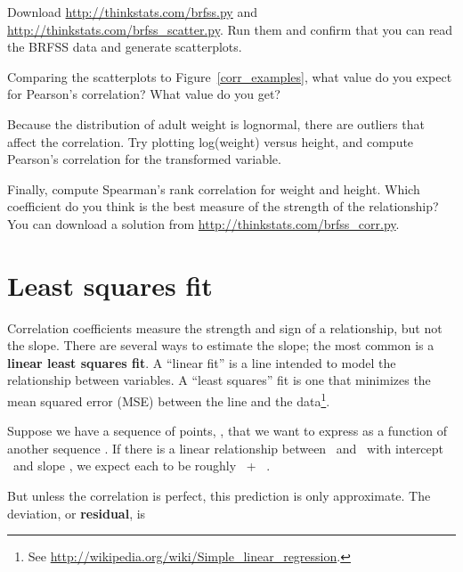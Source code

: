 \documentclass[12pt]{book}
\begin{document}
\begin{exercise}
Download \url{http://thinkstats.com/brfss.py} and
\url{http://thinkstats.com/brfss_scatter.py}.  Run them and confirm that you
can read the BRFSS data and generate scatterplots.

Comparing the scatterplots to Figure~\ref{corr_examples}, what value
do you expect for Pearson's correlation?  What value do you get?

Because the distribution of adult weight is lognormal, there are
outliers that affect the correlation.  Try plotting
log(weight) versus height, and compute Pearson's
correlation for the transformed variable.

Finally, compute Spearman's rank correlation for weight and height.
Which coefficient do you think is the best measure of the strength of
the relationship?  You can download a solution from
\url{http://thinkstats.com/brfss_corr.py}.

\end{exercise}


\section{Least squares fit}

Correlation coefficients measure the strength and sign of a
relationship, but not the slope.  There are several ways to estimate
the slope; the most common is a {\bf linear least squares fit}.  A
``linear fit'' is a line intended to model the relationship between
variables.  A ``least squares'' fit is one that minimizes the mean
squared error (MSE) between the line and the data\footnote{See
  \url{http://wikipedia.org/wiki/Simple_linear_regression}.}.

Suppose we have a sequence of points, \Y, that we want to express as a
function of another sequence \X.  If there is a linear relationship
between \X~and \Y~with intercept \myinter~and slope \myslope, we
expect each \y{} to be roughly \myinter~+ \myslope~\x{}.

But unless the correlation is perfect, this prediction is only
approximate.  The deviation, or {\bf residual}, is 
\end{document}
